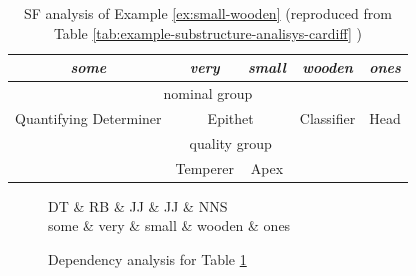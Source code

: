 
    \begin{table}[!ht]
    	\centering
    	\begin{tabular}{c|c|c|cc}
            \hline
            \multicolumn{1}{|c|}{\textit{some}}          & \textit{very}   & \textit{small}   & \multicolumn{1}{c|}{\textit{wooden}} & \multicolumn{1}{c|}{\textit{ones}} \\ \hline
            \multicolumn{5}{|c|}{nominal group}                                                                                                                           \\ \hline
            \multicolumn{1}{|c|}{Quantifying Determiner} & \multicolumn{2}{c|}{Epithet}       & \multicolumn{1}{c|}{Classifier}      & \multicolumn{1}{c|}{Head}          \\ \hline
            & \multicolumn{2}{c|}{quality group} &                                      &                                    \\ \cline{2-3}
            & Temperer        & Apex             &                                      &                                    \\ \cline{2-3}
        \end{tabular}
    	\caption{SF analysis of Example \ref{ex:small-wooden} (reproduced from Table \ref{tab:example-substructure-analisys-cardiff} )}
    	\label{tab:example-substructure-analisys-cardiff-repeated}
    \end{table}

    \begin{figure}[!ht]
    	\centering
    	\begin{dependency}
    		\begin{deptext}[]
    			DT \& RB \& JJ \& JJ \& NNS \\
    			some \& very \& small \& wooden \& ones \\
    		\end{deptext}
    	\end{dependency}
    	\caption{Dependency analysis for Table \ref{tab:example-substructure-analisys-cardiff-repeated} }
    	\label{fig:small-wooden-dependency}
    \end{figure}

